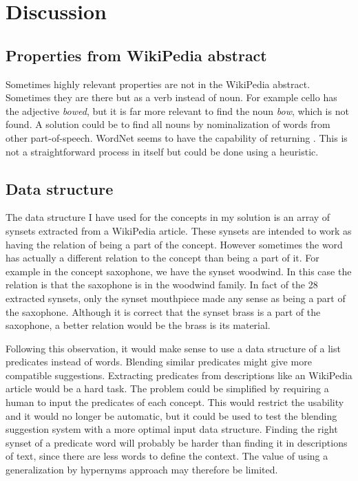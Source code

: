 
\chapter{Discussion} %

\label{Chapter8} %


\section{Properties from WikiPedia abstract}
Sometimes highly relevant properties are not in the WikiPedia abstract. Sometimes they are there but as a verb instead of noun. For example cello has the adjective \emph{bowed}, but it is far more relevant to find the noun \emph{bow}, which is not found. A solution could be to find all nouns by nominalization of words from other part-of-speech. WordNet seems to have the capability of returning . This is not a straightforward process in itself but could be done using a heuristic.


\section{Data structure}
The data structure I have used for the concepts in my solution is an array of synsets extracted from a WikiPedia article. These synsets are intended to work as having the relation of being a part of the concept. However sometimes the word has actually a different relation to the concept than being a part of it. For example in the concept saxophone, we have the synset woodwind. In this case the relation is that the saxophone is in the woodwind family. In fact of the 28 extracted synsets, only the synset mouthpiece made any sense as being a part of the saxophone. Although it is correct that the synset brass is a part of the saxophone, a better relation would be the brass is its material.

Following this observation, it would make sense to use a data structure of a list predicates instead of words. Blending similar predicates might give more compatible suggestions. Extracting predicates from descriptions like an WikiPedia article would be a hard task. The problem could be simplified by requiring a human to input the predicates of each concept. This would restrict the usability and it would no longer be automatic, but it could be used to test the blending suggestion system with a more optimal input data structure. Finding the right synset of a predicate word will probably be harder than finding it in descriptions of text, since there are less words to define the context. The value of using a generalization by hypernyms approach may therefore be limited.

